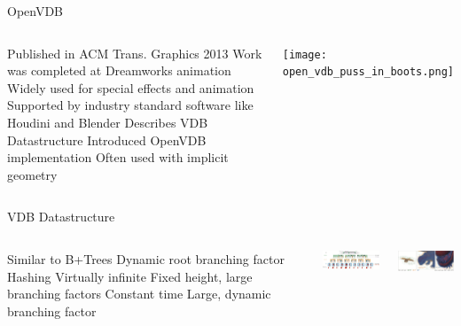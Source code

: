 \begin{frame}{OpenVDB}
\begin{columns}
\centering
\begin{outline}
    \1 Published in ACM Trans. Graphics 2013 \cite{Museth2013}
    \1 Work was completed at Dreamworks animation
    \1 Widely used for special effects and animation
      \2 Supported by industry standard software like Houdini and Blender
    \1 Describes VDB Datastructure
    \1 Introduced OpenVDB implementation
    \1 Often used with implicit geometry
\end{outline}
\centering
{}

\texttt{[image: open\_vdb\_puss\_in\_boots.png]} 

\end{columns}

\end{frame}

\begin{frame}{VDB Datastructure}
\begin{columns}
\centering
\begin{outline}
    \1 Similar to B+Trees
    \1 Dynamic root branching factor
      \2 Hashing
      \2 Virtually infinite
    \1 Fixed height, large branching factors
    \1 Constant time 
    \1 Large, dynamic branching factor 
\end{outline}
\centering
\includegraphics[width=5cm]{open_vdb_data_structure.png}

\includegraphics[width=5cm]{open_vdb_visual_aid.png} 


\end{columns}

\end{frame}
